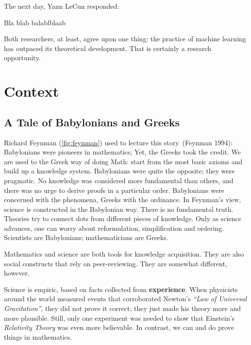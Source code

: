 \documentclass[
  a4paperpaper,
  a4paper,
  12pt,
  twoside,
  brazil,
  british,
  open=right]{scrbook}
\begin{document}
The next day, Yann LeCun
responded:

Bla blab balablblaab

Both researchers, at least, agree upon one thing: the practice of
machine learning has outpaced its theoretical development. That is
certainly a research opportunity.

\hypertarget{sec:context}{%
\section{Context}\label{sec:context}}

\hypertarget{sec:greeks}{%
\subsection{A Tale of Babylonians and Greeks}\label{sec:greeks}}

Richard Feynman (\protect\hyperlink{fig:feynman}{{[}fig:feynman{]}})
used to lecture this story~(Feynman
1994):
Babylonians were pioneers in mathematics; Yet, the Greeks took the
credit. We are used to the Greek way of doing Math: start from the most
basic axioms and build up a knowledge system. Babylonians were quite the
opposite; they were pragmatic. No knowledge was considered more
fundamental than others, and there was no urge to derive proofs in a
particular order. Babylonians were concerned with the phenomena, Greeks
with the ordinance. In Feynman's view, science is constructed in the
Babylonian way. There is no fundamental truth. Theories try to connect
dots from different pieces of knowledge. Only as science advances, one
can worry about reformulation, simplification and ordering. Scientists
are Babylonians; mathematicians are Greeks.

Mathematics and science are both tools for knowledge acquisition. They
are also social constructs that rely on peer-reviewing. They are
somewhat different, however.

Science is empiric, based on facts collected from \textbf{experience}.
When physicists around the world measured events that corroborated
Newton's \emph{``Law of Universal Gravitation''}, they did not prove it
correct; they just made his theory more and more plausible. Still, only
one experiment was needed to show that Einstein's \emph{Relativity
Theory} was even more believable. In contrast, we can and do prove
things in mathematics.
\end{document}
